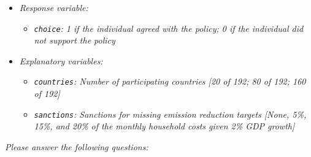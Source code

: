 \documentclass[12pt,letterpaper]{article}
\begin{document}
\begin{itemize}
	\item \textit{
	Response variable:} 
	\begin{itemize}
		\item \textit{ \texttt{choice}: 1 if the individual agreed with the policy; 0 if the individual did not support the policy}
	\end{itemize}
	\item \textit{
	Explanatory variables: }
	\begin{itemize}
		\item \textit{
		\texttt{countries}: Number of participating countries [20 of 192; 80 of 192; 160 of 192]}
		\item \textit{
		\texttt{sanctions}: Sanctions for missing emission reduction targets [None, 5\%, 15\%, and 20\% of the monthly household costs given 2\% GDP growth]}
		
	\end{itemize}
	
\end{itemize}

\newpage
\noindent \textit{Please answer the following questions:}
\end{document}
